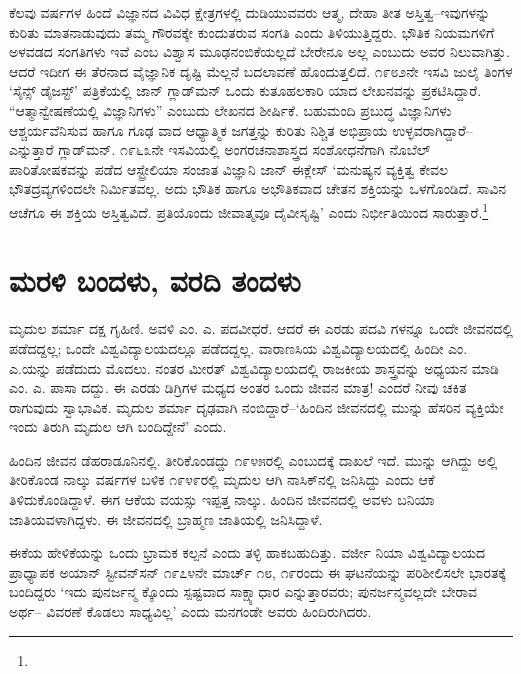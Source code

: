 ಕೆಲವು ವರ್ಷಗಳ ಹಿಂದೆ ವಿಜ್ಞಾನದ ವಿವಿಧ ಕ್ಷೇತ್ರಗಳಲ್ಲಿ ದುಡಿಯುವವರು ಆತ್ಮ, ದೇಹಾ ತೀತ ಅಸ್ತಿತ್ವ–ಇವುಗಳನ್ನು ಕುರಿತು ಮಾತನಾಡುವುದು ತಮ್ಮ ಗೌರವಕ್ಕೇ ಕುಂದುತರುವ ಸಂಗತಿ ಎಂದು ತಿಳಿಯುತ್ತಿದ್ದರು. ಭೌತಿಕ ನಿಯಮಗಳಿಗೆ ಅಳವಡದ ಸಂಗತಿಗಳು ಇವೆ ಎಂಬ ವಿಶ್ವಾಸ ಮೂಢನಂಬಿಕೆಯಲ್ಲದೆ ಬೇರೇನೂ ಅಲ್ಲ ಎಂಬುದು ಅವರ ನಿಲುವಾಗಿತ್ತು. ಆದರೆ ಇದೀಗ ಈ ತೆರನಾದ ವೈಜ್ಞಾನಿಕ ದೃಷ್ಟಿ ಮೆಲ್ಲನೆ ಬದಲಾವಣೆ ಹೊಂದುತ್ತಲಿದೆ. ೧೯೮೨ನೇ ಇಸವಿ ಜುಲೈ ತಿಂಗಳ ‘ಸೈನ್ಸ್ ಡೈಜಸ್ಟ್​’ ಪತ್ರಿಕೆಯಲ್ಲಿ ಜಾನ್ ಗ್ಲಾಡ್​ಮನ್ ಒಂದು ಕುತೂಹಲಕಾರಿ ಯಾದ ಲೇಖನವನ್ನು ಪ್ರಕಟಿಸಿದ್ದಾರೆ. “ಆತ್ಮಾನ್ವೇಷಣೆಯಲ್ಲಿ ವಿಜ್ಞಾನಿಗಳು” ಎಂಬುದು ಲೇಖನದ ಶೀರ್ಷಿಕೆ. ಬಹುಮಂದಿ ಪ್ರಬುದ್ಧ ವಿಜ್ಞಾನಿಗಳು ಆಶ್ಚರ್ಯವೆನಿಸುವ ಹಾಗೂ ಗೂಢ ವಾದ ಆಧ್ಯಾತ್ಮಿಕ ಜಗತ್ತನ್ನು ಕುರಿತು ನಿಶ್ಚಿತ ಅಭಿಪ್ರಾಯ ಉಳ್ಳವರಾಗಿದ್ದಾರೆ–ಎನ್ನುತ್ತಾರೆ ಗ್ಲಾಡ್​ಮನ್. ೧೯೬೩ನೇ ಇಸವಿಯಲ್ಲಿ ಅಂಗರಚನಾಶಾಸ್ತ್ರದ ಸಂಶೋಧನೆಗಾಗಿ ನೊಬೆಲ್ ಪಾರಿತೋಷಕವನ್ನು ಪಡೆದ ಆಸ್ಟ್ರೇಲಿಯಾ ಸಂಜಾತ ವಿಜ್ಞಾನಿ ಜಾನ್ ಈಕ್ಲೇಸ್ ‘ಮನುಷ್ಯನ ವ್ಯಕ್ತಿತ್ವ ಕೇವಲ ಭೌತದ್ರವ್ಯಗಳಿಂದಲೇ ನಿರ್ಮಿತವಲ್ಲ. ಅದು ಭೌತಿಕ ಹಾಗೂ ಅಭೌತಿಕವಾದ ಚೇತನ ಶಕ್ತಿಯನ್ನು ಒಳಗೊಂಡಿದೆ. ಸಾವಿನ ಆಚೆಗೂ ಈ ಶಕ್ತಿಯ ಅಸ್ತಿತ್ವವಿದೆ. ಪ್ರತಿಯೊಂದು ಜೀವಾತ್ಮವೂ ದೈವೀಸೃಷ್ಟಿ’ ಎಂದು ನಿರ್ಭೀತಿಯಿಂದ ಸಾರುತ್ತಾರೆ.\footnote{}


\section{ಮರಳಿ ಬಂದಳು, ವರದಿ ತಂದಳು}

ಮೃದುಲ ಶರ್ಮಾ ದಕ್ಷ ಗೃಹಿಣಿ. ಅವಳಿ ಎಂ. ಎ. ಪದವೀಧರೆ. ಆದರೆ ಈ ಎರಡು ಪದವಿ ಗಳನ್ನೂ ಒಂದೇ ಜೀವನದಲ್ಲಿ ಪಡೆದದ್ದಲ್ಲ; ಒಂದೇ ವಿಶ್ವವಿದ್ಯಾಲಯದಲ್ಲೂ ಪಡೆದದ್ದಲ್ಲ. ವಾರಾಣಸಿಯ ವಿಶ್ವವಿದ್ಯಾಲಯದಲ್ಲಿ ಹಿಂದೀ ಎಂ. ಎ.ಯನ್ನು ಪಡೆದುದು ಮೊದಲು. ನಂತರ ಮೀರತ್ ವಿಶ್ವವಿದ್ಯಾಲಯದಲ್ಲಿ ರಾಜಕೀಯ ಶಾಸ್ತ್ರವನ್ನು ಅಧ್ಯಯನ ಮಾಡಿ ಎಂ. ಎ. ಪಾಸಾ ದದ್ದು. ಈ ಎರಡು ಡಿಗ್ರಿಗಳ ಮಧ್ಯದ ಅಂತರ ಒಂದು ಜೀವನ ಮಾತ್ರ! ಎಂದರೆ ನೀವು ಚಕಿತ ರಾಗುವುದು ಸ್ವಾಭಾವಿಕ. ಮೃದುಲ ಶರ್ಮಾ ದೃಢವಾಗಿ ನಂಬಿದ್ದಾರೆ–‘ಹಿಂದಿನ ಜೀವನದಲ್ಲಿ ಮುನ್ನು ಹೆಸರಿನ ವ್ಯಕ್ತಿಯೇ ಇಂದು ತಿರುಗಿ ಮೃದುಲ ಆಗಿ ಬಂದಿದ್ದೇನೆ’ ಎಂದು.

ಹಿಂದಿನ ಜೀವನ ಡೆಹರಾಡೂನಿನಲ್ಲಿ. ತೀರಿಕೊಂಡದ್ದು ೧೯೪೫ರಲ್ಲಿ ಎಂಬುದಕ್ಕೆ ದಾಖಲೆ ಇದೆ. ಮುನ್ನು ಆಗಿದ್ದು ಅಲ್ಲಿ ತೀರಿಕೊಂಡ ನಾಲ್ಕು ವರ್ಷಗಳ ಬಳಿಕ ೧೯೪೯ರಲ್ಲಿ ಮೃದುಲ ಆಗಿ ನಾಸಿಕ್​ನಲ್ಲಿ ಜನಿಸಿದ್ದು ಎಂದು ಆಕೆ ತಿಳಿದುಕೊಂಡಿದ್ದಾಳೆ. ಈಗ ಆಕೆಯ ವಯಸ್ಸು ಇಪ್ಪತ್ತ ನಾಲ್ಕು. ಹಿಂದಿನ ಜೀವನದಲ್ಲಿ ಅವಳು ಬನಿಯಾ ಜಾತಿಯವಳಾಗಿದ್ದಳು. ಈ ಜೀವನದಲ್ಲಿ ಬ್ರಾಹ್ಮಣ ಜಾತಿಯಲ್ಲಿ ಜನಿಸಿದ್ದಾಳೆ.

ಈಕೆಯ ಹೇಳಿಕೆಯನ್ನು ಒಂದು ಭ್ರಾಮಕ ಕಲ್ಪನೆ ಎಂದು ತಳ್ಳಿ ಹಾಕಬಹುದಿತ್ತು. ವರ್ಜೀ ನಿಯಾ ವಿಶ್ವವಿದ್ಯಾಲಯದ ಪ್ರಾಧ್ಯಾಪಕ ಅಯಾನ್ ಸ್ಟೀವನ್​ಸನ್ ೧೯೭೪ನೇ ಮಾರ್ಚ್ ೧೮, ೧೯ರಂದು ಈ ಘಟನೆಯನ್ನು ಪರಿಶೀಲಿಸಲೇ ಭಾರತಕ್ಕೆ ಬಂದಿದ್ದರು ‘ಇದು ಪುನರ್ಜನ್ಮ ಕ್ಕೊಂದು ಸ್ಪಷ್ಟವಾದ ಸಾಕ್ಷ್ಯಾಧಾರ ಎನ್ನುತ್ತಾರವರು; ಪುನರ್ಜನ್ಮವಲ್ಲದೇ ಬೇರಾವ ಅರ್ಥ– ವಿವರಣೆ ಕೊಡಲು ಸಾಧ್ಯವಿಲ್ಲ’ ಎಂದು ಮನಗಂಡೇ ಅವರು ಹಿಂದಿರುಗಿದರು.

